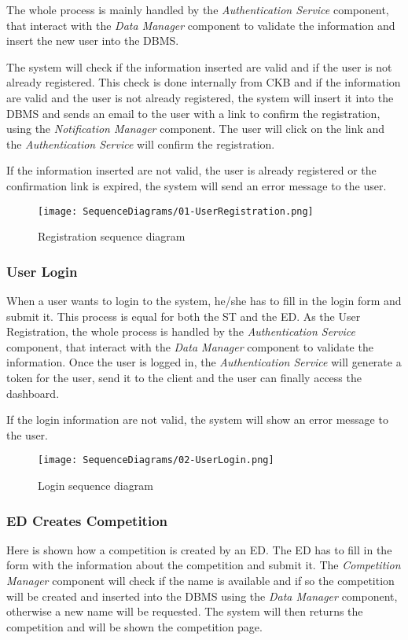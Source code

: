 The whole process is mainly handled by the \textit{Authentication Service} component, that interact with the \textit{Data Manager} component to validate the information and insert the new user into the DBMS.

The system will check if the information inserted are
 valid and if the user is not already registered. This check is done internally from CKB and if the information are valid and the user is not already registered, the system will insert it into the DBMS and sends an email to the user with a link to confirm the registration, using the \textit{Notification Manager} component. The user will click on the link and the \textit{Authentication Service} will confirm the registration.

If the information inserted are not valid, the user is already registered or the confirmation link is expired, the system will send an error message to the user.

\begin{figure}[H]
  \centering
  \texttt{[image: SequenceDiagrams/01-UserRegistration.png]}
  \caption{Registration sequence diagram}
  \label{fig:registratio_diagramn}
\end{figure}

\subsubsection*{User Login}
\label{ss:login_diagram}%
When a user wants to login to the system, he/she has to fill in the login form and submit it. This process is equal for both the ST and the ED. As the User Registration, the whole process is handled by the \textit{Authentication Service} component, that interact with the \textit{Data Manager} component to validate the information. Once the user is logged in, the \textit{Authentication Service} will generate a token for the user, send it to the client and the user can finally access the dashboard.

If the login information are not valid, the system will show an error message to the user.

\begin{figure}[H]
  \centering
  \texttt{[image: SequenceDiagrams/02-UserLogin.png]}
  \caption{Login sequence diagram}
  \label{fig:login_diagramn}
\end{figure}

\subsubsection*{ED Creates Competition}
\label{ss:create_competition_diagram}
Here is shown how a competition is created by an ED. The ED has to fill in the form with the information about the competition and submit it. The \textit{Competition Manager} component will check if the name is available and if so the competition will be created and inserted into the DBMS using the \textit{Data Manager} component, otherwise a new name will be requested. The system will then returns the competition and will be shown the competition page.


